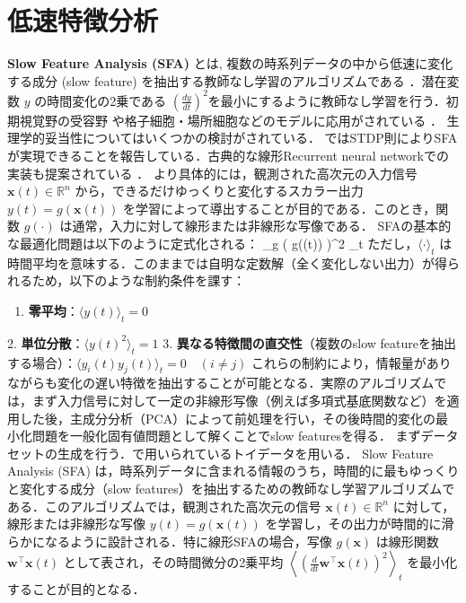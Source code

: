 \section{低速特徴分析}
\textbf{Slow Feature Analysis (SFA)} とは, 複数の時系列データの中から低速に変化する成分 (slow feature) を抽出する教師なし学習のアルゴリズムである \citep{Wiskott2002-vb,Wiskott2011-uz}．潜在変数 $y$ の時間変化の2乗である $\left(\frac{dy}{dt}\right)^2$を最小にするように教師なし学習を行う．初期視覚野の受容野 \citep{Berkes2005-i} や格子細胞・場所細胞などのモデルに応用がされている \citep{Franzius2007-sf}．
生理学的妥当性についてはいくつかの検討がされている．\citep{Sprekeler2007-qm} ではSTDP則によりSFAが実現できることを報告している．古典的な線形Recurrent neural networkでの実装も提案されている \citep{Lipshutz2020-uj}．
より具体的には，観測された高次元の入力信号 $\mathbf{x}(t) \in \mathbb{R}^n$ から，できるだけゆっくりと変化するスカラー出力 $y(t) = g(\mathbf{x}(t))$ を学習によって導出することが目的である．このとき，関数 $g(\cdot)$ は通常，入力に対して線形または非線形な写像である．
SFAの基本的な最適化問題は以下のように定式化される：
\min_{g} \left\langle \left(  g((t)) \right)^2 \right\rangle_t
ただし，$\langle \cdot \rangle_t$ は時間平均を意味する．このままでは自明な定数解（全く変化しない出力）が得られるため，以下のような制約条件を課す：
\begin{enumerate}
\item \textbf{零平均}：$\langle y(t) \rangle_t = 0$
\end{enumerate}
2. \textbf{単位分散}：$\langle y(t)^2 \rangle_t = 1$
3. \textbf{異なる特徴間の直交性}（複数のslow featureを抽出する場合）：$\langle y_i(t) y_j(t) \rangle_t = 0\quad (i \ne j)$
これらの制約により，情報量がありながらも変化の遅い特徴を抽出することが可能となる．実際のアルゴリズムでは，まず入力信号に対して一定の非線形写像（例えば多項式基底関数など）を適用した後，主成分分析（PCA）によって前処理を行い，その後時間的変化の最小化問題を一般化固有値問題として解くことでslow featuresを得る．
まずデータセットの生成を行う．\citep{Wiskott2002-vb}で用いられているトイデータを用いる．
Slow Feature Analysis (SFA) は，時系列データに含まれる情報のうち，時間的に最もゆっくりと変化する成分（slow features）を抽出するための教師なし学習アルゴリズムである．このアルゴリズムでは，観測された高次元の信号 $\mathbf{x}(t) \in \mathbb{R}^n$ に対して，線形または非線形な写像 $y(t) = g(\mathbf{x}(t))$ を学習し，その出力が時間的に滑らかになるように設計される．特に線形SFAの場合，写像 $g(\mathbf{x})$ は線形関数 $\mathbf{w}^\top \mathbf{x}(t)$ として表され，その時間微分の2乗平均 $\left\langle \left( \frac{d}{dt} \mathbf{w}^\top \mathbf{x}(t) \right)^2 \right\rangle_t$ を最小化することが目的となる．
